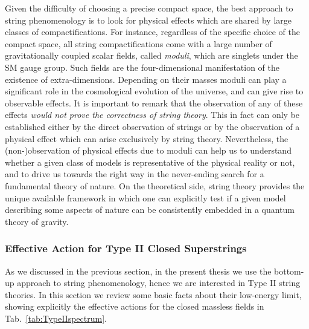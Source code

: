\documentclass[12pt,a4paper]{book}
\begin{document}
Given the difficulty of choosing a precise compact space, the best approach to string phenomenology is to look for physical effects which are shared by large classes of compactifications. For instance, regardless of the specific choice of the compact space, all string compactifications come with a large number of gravitationally coupled scalar fields, called \textit{moduli}, which are singlets under the SM gauge group. Such fields are the four-dimensional manifestation of the existence of extra-dimensions. Depending on their masses moduli can play a significant role in the cosmological evolution of the universe, and can give rise to observable effects. It is important to remark that the observation of any of these effects \textit{would not prove the correctness of string theory}. This in fact can only be established either by the direct observation of strings or by the observation of a physical effect which can arise exclusively by string theory. Nevertheless, the (non-)observation of physical effects due to moduli can help us to understand whether a given class of models is representative of the physical reality or not, and to drive us towards the right way in the never-ending search for a fundamental theory of nature. On the theoretical side, string theory provides the unique available framework in which one can explicitly test if a given model describing some aspects of nature can be consistently embedded in a quantum theory of gravity.%

\subsubsection{Effective Action for Type II Closed Superstrings}
\label{sssec:EffectiveActionsTypeII}

As we discussed in the previous section, in the present thesis we use the bottom-up approach to string phenomenology, hence we are interested in Type II string theories. In this section we review some basic facts about their low-energy limit, showing explicitly the effective actions for the closed massless fields in Tab.~\ref{tab:TypeIIspectrum}.\\
\end{document}
